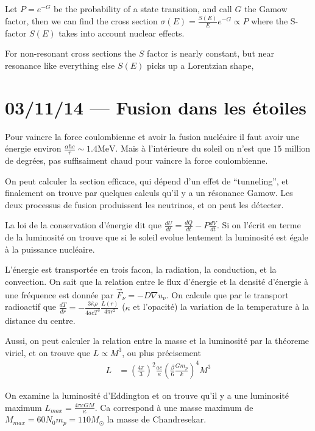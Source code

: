 \documentclass[10pt]{report}
\newcommand{\rd}[2]{\frac{d#1}{d#2}}
\begin{document}
Let $P = e^{-G}$ be the probability of a state transition, and call $G$ the Gamow factor, then we can find the cross section $\sigma(E) = \frac{S(E)}{E}e^{-G} \propto P$ where the S-factor $S(E)$ takes into account nuclear effects. 

For non-resonant cross sections the $S$ factor is nearly constant, but near resonance like everything else $S(E)$ picks up a Lorentzian shape,
\chapter{03/11/14 --- Fusion dans les \'etoiles}

Pour vaincre la force coulombienne et avoir la fusion nucl\'eaire il faut avoir une \'energie environ $\frac{\alpha \hbar c}{r} \sim 1.4\mathrm{MeV}$. Mais \`a l'int\'erieure du soleil on n'est que $15$ million de degr\'ees, pas suffisaiment chaud pour vaincre la force coulombienne.

On peut calculer la section efficace, qui d\'epend d'un effet de ``tunneling'', et finalement on trouve par quelques calculs qu'il y a un r\'esonance Gamow. Les deux processus de fusion produissent les neutrinos, et on peut les d\'etecter.

La loi de la conservation d'\'energie dit que $\rd{U}{t} = \rd{Q}{t} - P\rd{V}{t}$. Si on l'\'ecrit en terme de la luminosit\'e on trouve que si le soleil evolue lentement la luminosit\'e est \'egale \`a la puissance nucl\'eaire. 

L'\'energie est transport\'ee en trois facon, la radiation, la conduction, et la convection. On sait que la relation entre le flux d'\'energie et la densit\'e d'\'energie \`a une fr\'equence est donn\'ee par $\vec{F}_\nu = -D\nabla u_\nu$. On calcule que par le transport radioactif que $\rd{T}{r} = -\frac{3\overline{\kappa}\rho}{4acT^3}\frac{L(r)}{4\pi r^2}$ ($\kappa$ et l'opacit\'e) la variation de la temperature \`a la distance du centre.

Aussi, on peut calculer la relation entre la masse et la luminosit\'e par la th\'eoreme viriel, et on trouve que $L \propto M^3$, ou plus pr\'ecisement
\begin{align}
    L &= \left(\frac{4\pi}{3}\right)^2\frac{ac}{\kappa}\left(\frac{\beta}{6}\frac{G m_p}{k}\right)^4 M^3
\end{align}

On examine la luminosit\'e d'Eddington et on trouve qu'il y a une luminosit\'e maximum $L_{max} = \frac{4\pi c GM}{\kappa}$. Ca correspond \`a une masse maximum de $M_{max} = 60 N_0m_p = 110 M_\odot$ la masse de Chandresekar. 
\end{document}
